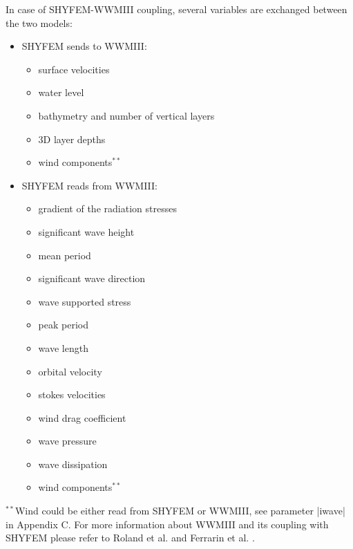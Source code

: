  In case of SHYFEM-WWMIII coupling, several variables are exchanged 
 between the two models:
 \begin{itemize}
 \item SHYFEM sends to WWMIII:
  \begin{itemize}
   \item surface velocities
   \item water level
   \item bathymetry and number of vertical layers
   \item 3D layer depths
   \item wind components$^{**}$
  \end{itemize}
 \item SHYFEM reads from WWMIII:
  \begin{itemize}
   \item gradient of the radiation stresses
   \item significant wave height
   \item mean period
   \item significant wave direction
   \item wave supported stress
   \item peak period
   \item wave length
   \item orbital velocity
   \item stokes velocities
   \item wind drag coefficient
   \item wave pressure
   \item wave dissipation
   \item wind components$^{**}$
 \end{itemize}
 \end{itemize}

 $^{**}$Wind could be either read from SHYFEM or WWMIII, see parameter 
 |iwave| in Appendix C.
 For more information about WWMIII and its coupling with SHYFEM please refer
 to Roland et al. \cite{roland:coupled09} and Ferrarin et al. 
 \cite{ferrarin:morpho08}.
